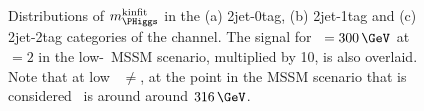 \begin{figure}[h!]
\begin{center}
~\\
\end{center}
\caption[Distributions of $m_{\PHiggs}^{\text{kinfit}}$ in the 2jet-0tag,
2jet-1tag and 2jet-2tag categories of the \mutau channel.]{Distributions of $m_{\PHiggs}^{\text{kinfit}}$ in the (a) 2jet-0tag, (b) 2jet-1tag and (c) 2jet-2tag categories 
of the \mutau channel. The \Htohhtobbtautau signal for \mA~$= 300\,\GeV$ at \tanb~$=2$ in the low-\tanb~MSSM
scenario, multiplied by 10, is also overlaid. Note that at low \tanb~\mA$\neq$\mH, at the point in the MSSM scenario
that is considered \mH~is around 
around $316\,\GeV$.}
\label{fig:hhh_results_mhkinfit_mutau}
\end{figure}

